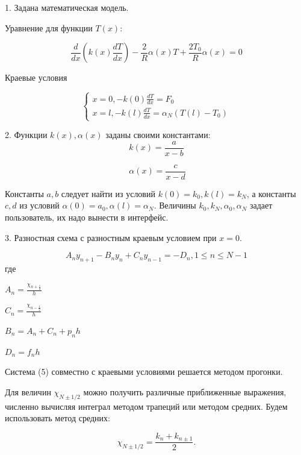 \documentclass[a4paper,14pt]{article}
\begin{document}
1. Задана математическая модель.

Уравнение для функции $T(x)$:

\begin{equation}
	\frac{d}{dx} \left( k(x) \frac{dT}{dx} \right) - \frac{2}{R} \alpha(x) T + \frac{2T_0}{R} \alpha(x) = 0
\end{equation}

Краевые условия

\begin{equation}
	\begin{cases}
		x = 0, -k(0) \frac{dT}{dx} = F_0 \\
		x = l, -k(l) \frac{dT}{dx} = \alpha_N \left( T(l) - T_0 \right)
  	\end{cases}
\end{equation}

2. Функции $k(x), \alpha(x)$ заданы своими константами:
\begin{equation}
	k(x) = \frac{a}{x - b}
\end{equation}

\begin{equation}\
	\alpha(x) = \frac{c}{x - d}
\end{equation}

Константы $a, b$ следует найти из условий $k(0) = k_0, k(l) = k_N$, а константы
$c, d$ из условий $\alpha(0) = a_0, \alpha(l) = \alpha_N$. Величины
$k_0, k_N, \alpha_0, \alpha_N$ задает пользователь, их надо вынести в интерфейс.

3. Разностная схема с разностным краевым условием при $x = 0$.

\begin{equation}
	A_n y_{n+1} - B_n y_n + C_n y_{n-1} = - D_n, 1 \leq n \leq N -1
\end{equation}
где

$A_n = \frac{\chi_{n + \frac{1}{2}}}{h}$

$C_n = \frac{\chi_{n - \frac{1}{2}}}{h}$

$B_n = A_n + C_n + p_n h$

$D_n = f_n h$

Система (5) совместно с краевыми условиями решается методом прогонки.

Для величин $\chi_{N \pm 1/2}$ можно получить различные приближенные выражения,
численно вычисляя интеграл методом трапеций или методом средних.
Будем использовать метод средних:

\begin{equation}
	\chi_{N \pm 1/2} = \frac{k_n +  k_{n \pm 1}}{2}.
\end{equation}
\end{document}
